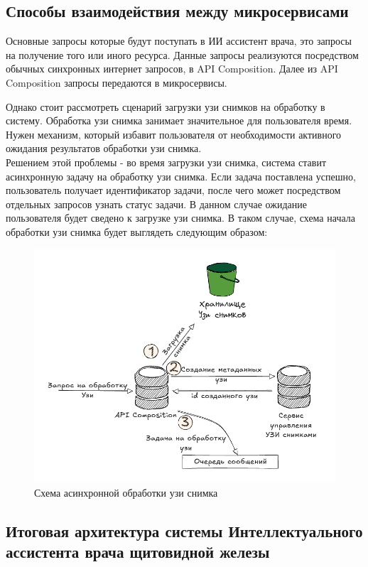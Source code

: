 \subsection{Способы взаимодействия между микросервисами}
Основные запросы которые будут поступать в ИИ ассистент врача, это запросы на получение того или иного ресурса. Данные запросы
реализуются посредством обычных синхронных интернет запросов, в API Composition. Далее из API Composition запросы передаются в микросервисы.


Однако стоит рассмотреть сценарий загрузки узи снимков на обработку в систему. Обработка узи снимка занимает значительное для пользователя время.
Нужен механизм, который избавит пользователя от необходимости активного ожидания результатов обработки узи снимка.\\
Решением этой проблемы - во время загрузки узи снимка, система ставит асинхронную задачу на обработку узи снимка. Если 
задача поставлена успешно, пользователь получает идентификатор задачи, после чего может посредством отдельных запросов узнать статус задачи.
В данном случае ожидание пользователя будет сведено к загрузке узи снимка.
В таком случае, схема начала обработки узи снимка будет выглядеть следующим образом:
\begin{figure}[H]%
	\begin{center}
		\includegraphics[width=.6\columnwidth]{./img/new/async.png}%
	\end{center}
	\caption{Схема асинхронной обработки узи снимка}%
	\label{pic:async}%
\end{figure}

\subsection{Итоговая архитектура системы Интеллектуального ассистента врача щитовидной железы}

